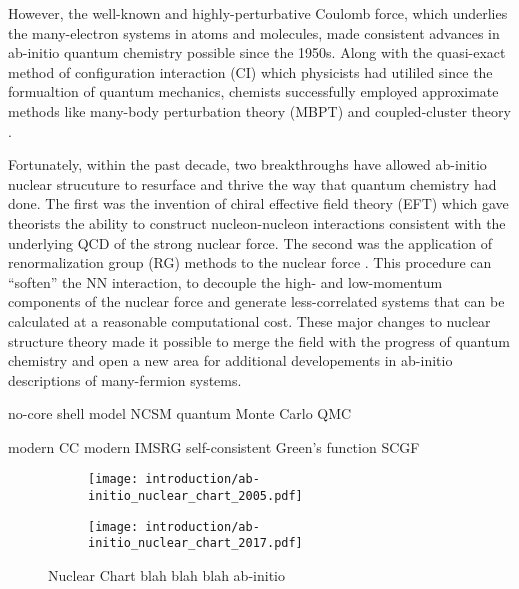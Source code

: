 \documentclass[../thesis.tex]{subfiles}
\begin{document}
However, the well-known and highly-perturbative Coulomb force, which underlies the many-electron systems in atoms and molecules, made consistent advances in ab-initio quantum chemistry possible since the 1950s.  Along with the quasi-exact method of configuration interaction (CI) \cite{SLATER19291293,CONDON19301121,BACHER1933264,UFFORD1933732} which physicists had utililed since the formualtion of quantum mechanics, chemists successfully employed approximate methods like many-body perturbation theory (MBPT) \cite{HUBBARD1957539,HUGENHOLTZ1957481,SCHAEFER1984,SHAVITT2009} and coupled-cluster theory \cite{CIZEK19664256,CIZEK1971359,CIZEK1980251,PIECUCH2002527,SHAVITT2009}.

Fortunately, within the past decade, two breakthroughs have allowed ab-initio nuclear strucuture to resurface and thrive the way that quantum chemistry had done.  The first was the invention of chiral effective field theory (EFT) \cite{EPELBAUM20091773,MACHLEIDT20111} which gave theorists the ability to construct nucleon-nucleon interactions consistent with the underlying QCD of the strong nuclear force.  The second was the application of renormalization group (RG) methods to the nuclear force \cite{BOGNER201094,ROTH2011072501}.  This procedure can ``soften'' the NN interaction, to decouple the high- and low-momentum components of the nuclear force and generate less-correlated systems that can be calculated at a reasonable computational cost.  These major changes to nuclear structure theory made it possible to merge the field with the progress of quantum chemistry and open a new area for additional developements in ab-initio descriptions of many-fermion systems.

no-core shell model NCSM \cite{NAVRATIL2000054311,NAVRATIL2009083101,BARRETT2013131}
quantum Monte Carlo QMC \cite{PUDLINER19971720,PIEPER200153,CARLSON20151067}

modern CC \cite{WLOCH2005212501,WLOCH2005S1291,JANSEN2014142502,JANSEN2016011301,HAGEN2015186,KOWALSKI2004132501,GOUR2006024310,BINDER2013054319}
modern IMSRG \cite{TSUKIYAMA2011222502,TSUKIYAMA2012061304,HERGERT2013242501,BOGNER2014142501,HERGERT2014041302,HERGERT2017023002,STROBERG2016051301,STROBERG2017032502}
self-consistent Green's function SCGF \cite{SOMA2013011303,SOMA2014024323,SOMA2014061301}

\begin{figure}
  \centering
  \begin{subfigure}{\textwidth}
    \centering
    \texttt{[image: introduction/ab-initio\_nuclear\_chart\_2005.pdf]}
  \end{subfigure}
  
  \begin{subfigure}{\textwidth}
    \centering
    \texttt{[image: introduction/ab-initio\_nuclear\_chart\_2017.pdf]}
  \end{subfigure}
  \caption{Nuclear Chart blah blah blah ab-initio}
  \label{fig:AbInitioChart}
\end{figure}
\end{document}
